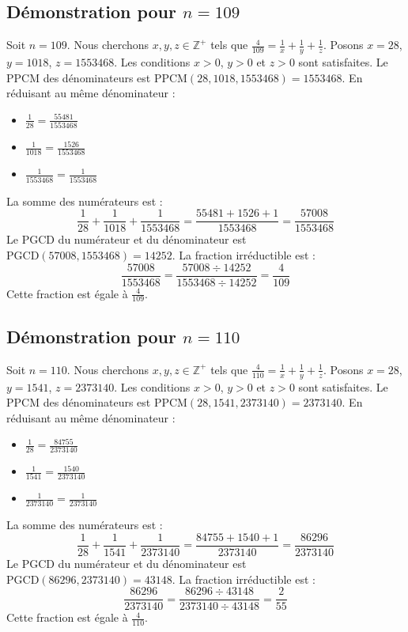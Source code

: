 \documentclass[11pt,a4paper]{article}
\begin{document}
\subsection{Démonstration pour $n = 109$}
Soit $n = 109$. Nous cherchons $x, y, z \in \mathbb{Z}^{+}$ tels que $\frac{4}{109} = \frac{1}{x} + \frac{1}{y} + \frac{1}{z}$.
Posons $x = 28$, $y = 1018$, $z = 1553468$.
Les conditions $x > 0$, $y > 0$ et $z > 0$ sont satisfaites.
Le PPCM des dénominateurs est $\text{PPCM}(28, 1018, 1553468) = 1553468$.
En réduisant au même dénominateur :
\begin{itemize}
    \item $\frac{1}{28} = \frac{55481}{1553468}$
    \item $\frac{1}{1018} = \frac{1526}{1553468}$
    \item $\frac{1}{1553468} = \frac{1}{1553468}$
\end{itemize}
La somme des numérateurs est :
$$ \frac{1}{28} + \frac{1}{1018} + \frac{1}{1553468} = \frac{55481 + 1526 + 1}{1553468} = \frac{57008}{1553468} $$
Le PGCD du numérateur et du dénominateur est $\text{PGCD}(57008, 1553468) = 14252$.
La fraction irréductible est :
$$ \frac{57008}{1553468} = \frac{57008 \div 14252}{1553468 \div 14252} = \frac{4}{109} $$
Cette fraction est égale à $\frac{4}{109}$.

\subsection{Démonstration pour $n = 110$}
Soit $n = 110$. Nous cherchons $x, y, z \in \mathbb{Z}^{+}$ tels que $\frac{4}{110} = \frac{1}{x} + \frac{1}{y} + \frac{1}{z}$.
Posons $x = 28$, $y = 1541$, $z = 2373140$.
Les conditions $x > 0$, $y > 0$ et $z > 0$ sont satisfaites.
Le PPCM des dénominateurs est $\text{PPCM}(28, 1541, 2373140) = 2373140$.
En réduisant au même dénominateur :
\begin{itemize}
    \item $\frac{1}{28} = \frac{84755}{2373140}$
    \item $\frac{1}{1541} = \frac{1540}{2373140}$
    \item $\frac{1}{2373140} = \frac{1}{2373140}$
\end{itemize}
La somme des numérateurs est :
$$ \frac{1}{28} + \frac{1}{1541} + \frac{1}{2373140} = \frac{84755 + 1540 + 1}{2373140} = \frac{86296}{2373140} $$
Le PGCD du numérateur et du dénominateur est $\text{PGCD}(86296, 2373140) = 43148$.
La fraction irréductible est :
$$ \frac{86296}{2373140} = \frac{86296 \div 43148}{2373140 \div 43148} = \frac{2}{55} $$
Cette fraction est égale à $\frac{4}{110}$.
\end{document}
